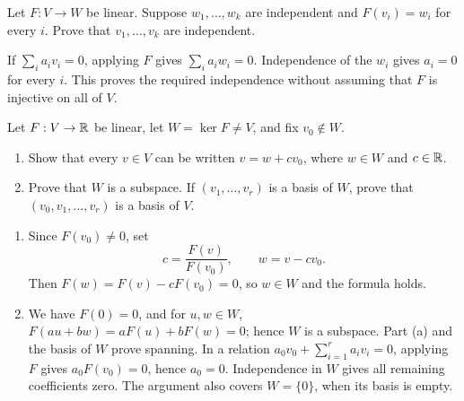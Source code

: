 \begin{problem}\label{ex:04:independent-preimages}
Let \(F:V\to W\) be linear. Suppose \(w_1,\ldots,w_k\) are independent
and \(F(v_i)=w_i\) for every \(i\). Prove that \(v_1,\ldots,v_k\) are independent.
\end{problem}
\begin{solution}
If \(\sum_i a_iv_i=0\), applying \(F\) gives
\(\sum_i a_iw_i=0\). Independence of the \(w_i\) gives \(a_i=0\)
for every \(i\). This proves the required independence without assuming
that \(F\) is injective on all of \(V\).
\end{solution}

\begin{problem}\label{ex:04:scalar-kernel}
Let \(F:V\to\mathbb R\) be linear, let \(W=\ker F\ne V\), and fix \(v_0\notin W\).
\begin{enumerate}
\item Show that every \(v\in V\) can be written \(v=w+cv_0\), where
\(w\in W\) and \(c\in\mathbb R\).
\item Prove that \(W\) is a subspace. If \((v_1,\ldots,v_r)\) is a
basis of \(W\), prove that \((v_0,v_1,\ldots,v_r)\) is a basis of \(V\).
\end{enumerate}
\end{problem}
\begin{solution}
\begin{enumerate}
\item Since \(F(v_0)\ne0\), set
\[
c=\frac{F(v)}{F(v_0)},\qquad w=v-cv_0.
\]
Then \(F(w)=F(v)-cF(v_0)=0\), so \(w\in W\) and the formula holds.
\item We have \(F(0)=0\), and for \(u,w\in W\),
\(F(au+bw)=aF(u)+bF(w)=0\); hence \(W\) is a subspace.
Part (a) and the basis of \(W\) prove spanning.
In a relation \(a_0v_0+\sum_{i=1}^r a_iv_i=0\), applying \(F\) gives
\(a_0F(v_0)=0\), hence \(a_0=0\).
Independence in \(W\) gives all remaining coefficients zero.
The argument also covers \(W=\{0\}\), when its basis is empty.
\end{enumerate}
\end{solution}

